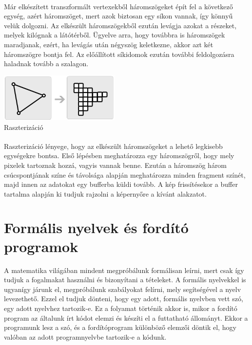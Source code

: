 \documentclass[12pt]{report}
\begin{document}
\paragraph{}
Már elkészített transzformált vertexekből háromszögeket épít fel a következő egység, azért háromszöget, mert azok biztosan egy síkon vannak, így könnyű velük dolgozni. Az elkészült háromszögekből ezután levágja azokat a részeket, melyek kilógnak a látótérből. Ügyelve arra, hogy továbbra is háromszögek maradjanak, ezért, ha levágás után négyszög keletkezne, akkor azt két háromszögre bontja fel. Az előállított síkidomok ezután további feldolgozásra haladnak tovább a szalagon.
\begin{center}
\includegraphics[width=6cm]{pics/rasterization}\\
{\footnotesize Raszterizáció}
\end{center}
\paragraph{}
Raszterizáció lényege, hogy az elkészült háromszögeket a lehető legkisebb egységekre bontsa. Első lépésben meghatározza egy háromszögről, hogy mely pixelek tartoznak hozzá, vagyis vannak benne. Ezután a háromszög három csúcspontjának színe és távolsága alapján meghatározza minden fragment színét, majd innen az adatokat egy bufferba küldi tovább. A kép frissítésekor a buffer tartalma alapján ki tudjuk rajzolni a képernyőre a kívánt alakzatot.

\newpage
\section{Formális nyelvek és fordító programok}
\paragraph{}
A matematika világában mindent megpróbálunk formálisan leírni, mert csak így tudjuk a fogalmakat használni és bizonyítani a tételeket. A formális nyelvekkel is ugyanígy járunk el, megpróbálunk szabályokat felírni, mely segítségével a nyelv levezethető. Ezzel el tudjuk dönteni, hogy egy adott, formális nyelvben vett szó, egy adott nyelvhez tartozik-e. Ez a folyamat történik akkor is, mikor a fordító program az általunk írt kódot elemzi és készíti el a futtatható állományt. Ekkor a programunk lesz a szó, és a fordítóprogram különböző elemzői döntik el, hogy valóban az adott programnyelvbe tartozik-e a kódunk.
\end{document}
